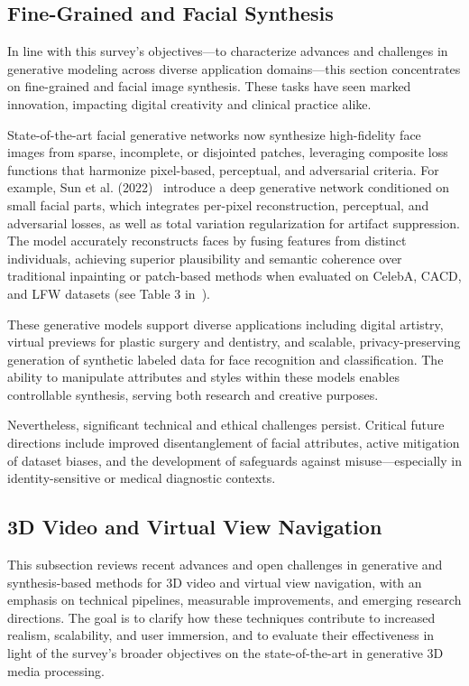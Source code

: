 \documentclass[sigconf]{acmart}
\begin{document}
\subsection{Fine-Grained and Facial Synthesis}

In line with this survey's objectives—to characterize advances and challenges in generative modeling across diverse application domains—this section concentrates on fine-grained and facial image synthesis. These tasks have seen marked innovation, impacting digital creativity and clinical practice alike.

State-of-the-art facial generative networks now synthesize high-fidelity face images from sparse, incomplete, or disjointed patches, leveraging composite loss functions that harmonize pixel-based, perceptual, and adversarial criteria. For example, Sun et al. (2022)~\cite{ref97} introduce a deep generative network conditioned on small facial parts, which integrates per-pixel reconstruction, perceptual, and adversarial losses, as well as total variation regularization for artifact suppression. The model accurately reconstructs faces by fusing features from distinct individuals, achieving superior plausibility and semantic coherence over traditional inpainting or patch-based methods when evaluated on CelebA, CACD, and LFW datasets (see Table 3 in~\cite{ref97}).

These generative models support diverse applications including digital artistry, virtual previews for plastic surgery and dentistry, and scalable, privacy-preserving generation of synthetic labeled data for face recognition and classification. The ability to manipulate attributes and styles within these models enables controllable synthesis, serving both research and creative purposes.

Nevertheless, significant technical and ethical challenges persist. Critical future directions include improved disentanglement of facial attributes, active mitigation of dataset biases, and the development of safeguards against misuse—especially in identity-sensitive or medical diagnostic contexts.

\subsection{3D Video and Virtual View Navigation}

This subsection reviews recent advances and open challenges in generative and synthesis-based methods for 3D video and virtual view navigation, with an emphasis on technical pipelines, measurable improvements, and emerging research directions. The goal is to clarify how these techniques contribute to increased realism, scalability, and user immersion, and to evaluate their effectiveness in light of the survey's broader objectives on the state-of-the-art in generative 3D media processing.
\end{document}
